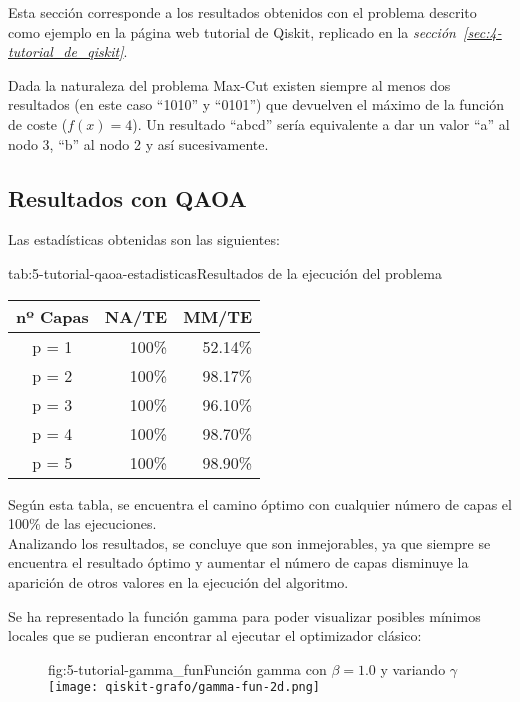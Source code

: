 Esta sección corresponde a los resultados obtenidos con el problema descrito como ejemplo en la página web tutorial de Qiskit\cite{qiskit_tutorial_antiguo}, replicado en la \textit{sección~\ref{sec:4-tutorial_de_qiskit}}.

Dada la naturaleza del problema Max-Cut existen siempre al menos dos resultados (en este caso ``1010'' y ``0101'') que devuelven el máximo de la función de coste ($f(x) = 4$).
Un resultado ``abcd'' sería equivalente a dar un valor ``a'' al nodo 3, ``b'' al nodo 2 y así sucesivamente.

\subsection{Resultados con QAOA}

Las estadísticas obtenidas son las siguientes:

\begin{table}[Resultados QAOA {--} max-cut en grafo de 4 aristas]{tab:5-tutorial-qaoa-estadisticas}{Resultados de la ejecución del problema~\cite{qiskit_tutorial_antiguo}}
  \begin{tabular}{|c|r|r|}
    \hline
    \textbf{nº Capas} & \textbf{NA/TE} & \textbf{MM/TE} \\ \hline
    p = 1 & 100\% & 52.14\% \\ \hline
    p = 2 & 100\% & 98.17\% \\ \hline
    p = 3 & 100\% & 96.10\% \\ \hline
    p = 4 & 100\% & 98.70\% \\ \hline
    p = 5 & 100\% & 98.90\% \\ \hline
  \end{tabular}
\end{table}

Según esta tabla, se encuentra el camino óptimo con cualquier número de capas el 100\% de las ejecuciones.
\\
Analizando los resultados, se concluye que son inmejorables, ya que siempre se encuentra el resultado óptimo y aumentar el número de capas disminuye la aparición de otros valores en la ejecución del algoritmo.

Se ha representado la función gamma para poder visualizar posibles mínimos locales que se pudieran encontrar al ejecutar el optimizador clásico:

\begin{figure}[Función gamma {--} max-cut en grafo de 4 aristas]{fig:5-tutorial-gamma_fun}{Función gamma con \(\beta = 1.0\) y variando \(\gamma\)}
  \texttt{[image: qiskit-grafo/gamma-fun-2d.png]}
\end{figure}

